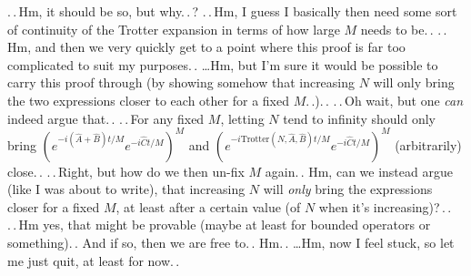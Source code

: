 \documentclass{report}
\begin{document}
.\,.\,Hm, it should be so, but why.\,.\,? .\,.\,Hm, I guess I basically then need some sort of continuity of the Trotter expansion in terms of how large $M$ needs to be.\,. .\,.\,Hm, and then we very quickly get to a point where this proof is far too complicated to suit my purposes.\,. 
\ldots Hm, but I'm sure it would be possible to carry this proof through (by showing somehow that increasing $N$ will only bring the two expressions closer to each other for a fixed $M$.\,.).\,. .\,.\,Oh wait, but one \emph{can} indeed argue that.\,. .\,.\,For any fixed $M$, letting $N$ tend to infinity should only bring $(e^{-i (\hat A + \hat B) t / M} e^{-i \hat C t / M} )^M$ and $(e^{-i \mathrm{Trotter}(N, \hat A, \hat B) t / M} e^{-i \hat C t / M} )^M$ (arbitrarily) close.\,. .\,.\,Right, but how do we then un-fix $M$ again.\,. Hm, can we instead argue (like I was about to write), that increasing $N$ will \emph{only} bring the expressions closer for a fixed $M$, at least after a certain value (of $N$ when it's increasing)?\,.\,. .\,.\,Hm yes, that might be provable (maybe at least for bounded operators or something).\,. And if so, then we are free to.\,. Hm.\,. \ldots Hm, now I feel stuck, so let me just quit, at least for now.\,. %
\end{document}
